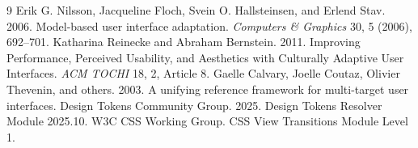 \documentclass[manuscript]{acmart}
\begin{document}
\begingroup\scriptsize
\begin{thebibliography}{9}
\setlength{\itemsep}{0pt}\setlength{\parsep}{0pt}\setlength{\parskip}{0pt}
Erik G. Nilsson, Jacqueline Floch, Svein O. Hallsteinsen, and Erlend Stav.
2006. Model-based user interface adaptation. \emph{Computers \& Graphics} 30, 5 (2006), 692--701.
Katharina Reinecke and Abraham Bernstein. 2011. Improving Performance, Perceived Usability,
and Aesthetics with Culturally Adaptive User Interfaces. \emph{ACM TOCHI} 18, 2, Article 8.
Gaelle Calvary, Joelle Coutaz, Olivier Thevenin, and others. 2003.
A unifying reference framework for multi-target user interfaces.
Design Tokens Community Group. 2025. Design Tokens Resolver Module 2025.10.
W3C CSS Working Group. CSS View Transitions Module Level 1.
\end{thebibliography}
\endgroup
\end{document}

